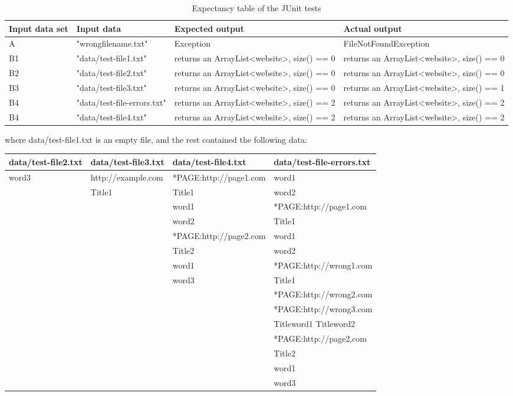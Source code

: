 \begin{table}[!h]
\caption{Expectancy table of the JUnit tests}
\begin{tabular}{|l|p{85pt}|p{100pt}|p{100pt}|}
\hline
\textbf{Input data set} & \textbf{Input data} & \textbf{Expected output} & \textbf{Actual output} \\ \hline
A & "wrongfilename.txt" & Exception & FileNotFoundException \\ \hline
B1 & "data/test-file1.txt" & returns an ArrayList<website>, size() == 0 & returns an ArrayList<website>, size() == 0 \\ \hline
B2 & "data/test-file2.txt" & returns an ArrayList<website>, size() == 0 & returns an ArrayList<website>, size() == 0 \\ \hline
B3 & "data/test-file3.txt" & returns an ArrayList<website>, size() == 0 & returns an ArrayList<website>, size() == 1 \\ \hline
B4 & "data/test-file-errors.txt" & returns an ArrayList<website>, size() == 2 & returns an ArrayList<website>, size() == 2 \\ \hline
B4 & "data/test-file4.txt" & returns an ArrayList<website>, size() == 2 & returns an ArrayList<website>, size() == 2 \\ \hline
\end{tabular}
\label{FH:resuts}
\end{table}

where data/test-file1.txt is an empty file, and the rest contained the following data:

\begin{table}[!h]
\begin{tabular}{|l|l|l|l|}
\hline
\textbf{data/test-file2.txt} & \textbf{data/test-file3.txt} & \textbf{data/test-file4.txt} & \textbf{data/test-file-errors.txt} \\ \hline
word3 & http://example.com & *PAGE:http://page1.com &  word1 \\
& Title1 & Title1 & word2 \\
&  & word1 & *PAGE:http://page1.com \\
&  & word2 & Title1 \\
&  & *PAGE:http://page2.com & word1 \\
&  & Title2 & word2 \\
&  & word1 &  *PAGE:http://wrong1.com \\
&  & word3 & Title1 \\
&  &  & *PAGE:http://wrong2.com \\
&  &  & *PAGE:http://wrong3.com \\
&  &  & Titleword1 Titleword2 \\
&  &  & *PAGE:http://page2.com \\
&  &  & Title2 \\
&  &  & word1 \\
&  &  & word3
\end{tabular}
\end{table}

